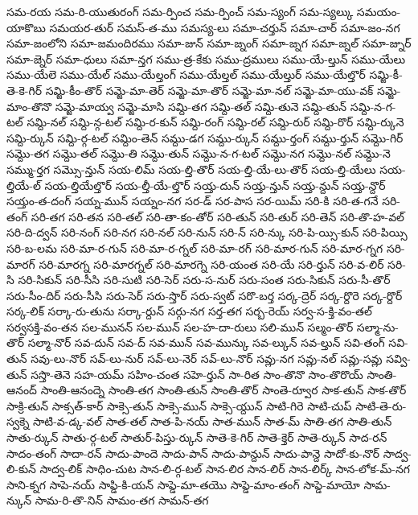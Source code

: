 {సమ-రయ
సమ-రి-యుతురంగ్
సమ-ర్పించ
సమ-ర్పించ్
సమ-స్యంగ్
సమ-స్యల్కు
సమయం-యాకొబు
సమయర-తుర్
సమస్-త-ము
సమస్య-లు
సమా-చర్తున్
సమా-చార్
సమా-జం-నగ
సమా-జంలోని
సమా-జమందిరము
సమా-జున్
సమా-జ్నంగ్
సమా-జ్నగ
సమా-జ్నల్
సమా-జ్నుర్
సమా-జ్నెర్
సమా-ధులు
సమా-న్తగ
సము-త్ర-కేకు
సము-ద్రములు
సము-యే-ల్తున్
సము-యేలు
సము-యేలె
సము-యేల్
సము-యేల్తంగ్
సము-యేల్తల్
సము-యేల్తుర్
సము-యేల్తొర్
సమ్జి-కీ-తె-కె-గిర్
సమ్జి-కీం-తొర్
సమ్జె-మా-తెర్
సమ్జె-మా-తొర్
సమ్జె-మా-నల్
సమ్జె-మా-యు-వక్
సమ్జె-మాం-తొనొ
సమ్జె-మాయ్వ
సమ్జె-మాసి
సమ్ది-తగ
సమ్ది-తల్
సమ్ది-తునె
సమ్ది-తున్
సమ్ది-న-గ-టల్
సమ్ది-నల్
సమ్ది-న్గ-టల్
సమ్ది-ర-కున్
సమ్ది-రంగ్
సమ్ది-రల్
సమ్ది-రుర్
సమ్ది-రొర్
సమ్ది-ర్కునె
సమ్ది-ర్కున్
సమ్ది-ర్గ-టల్
సమ్దిం-తెన్
సమ్దు-డగ
సమ్దు-ర్కున్
సమ్దు-ర్తంగ్
సమ్దు-ర్తున్
సమ్దొ-గిర్
సమ్దొ-తగ
సమ్దొ-తల్
సమ్దొ-తి
సమ్దొ-తున్
సమ్దొ-న-గ-టల్
సమ్దొ-నగ
సమ్దొ-నల్
సమ్దొ-నె
సమ్ము-ర్తగ
సమ్సొ-న్తున్
సయ-లిమ్
సయ-ల్తి-తొర్
సయ-ల్తి-యే-లు-తొర్
సయ-ల్తి-యేలు
సయ-ల్తియే-ల్
సయ-ల్తియేల్తొర్
సయ-ల్తీ-యే-ల్తొర్
సయ్త-దున్
సయ్త-న్తున్
సయ్త-న్దున్
సయ్త-న్దొర్
సయ్తం-త-దంగ్
సయ్న-మున్
సయ్నం-నగ
సర-డ్
సర-పాస
సర-యిమ్
సరి-కి
సరి-త-గనే
సరి-తంగ్
సరి-తగ
సరి-తన
సరి-తల్
సరి-తా-కం-తోర్
సరి-తున్
సరి-తుర్
సరి-తెన్
సరి-తొ-హ-వల్
సరి-ది-ద్వన్
సరి-నంగ్
సరి-నగ
సరి-నల్
సరి-నున్
సరి-న్
సరి-న్కు
సరి-పి-య్సి-కున్
సరి-పియ్సి
సరి-బ-లమ
సరి-మా-ర-గున్
సరి-మా-ర-గ్నల్
సరి-మా-రగ్
సరి-మార-గున్
సరి-మార-గ్నగ
సరి-మారగ్
సరి-మారగ్న
సరి-మారగ్నల్
సరి-మారగ్నె
సరి-యంత
సరి-యే
సరి-ర్తున్
సరి-వ-లిర్
సరి-సి
సరి-సికున్
సరి-సీసి
సరి-సుటి
సరి-సెర్
సరు-స-నుర్
సరు-సంత
సరు-సికున్
సరు-సీ-తొర్
సరు-సీం-దిర్
సరు-సీసి
సరు-సెర్
సరు-స్తొర్
సరు-స్వట్
సరొ-బర్త
సర్క-ద్రెర్
సర్క-ర్దొరె
సర్క-ర్దొర్
సర్క-లిక్
సర్కా-రు-తును
సర్కా-ర్దున్
సర్గు-నగ
సర్త-తగ
సర్బ-రెయ్
సర్వ-స-క్తి-వం-తల్
సర్వసక్తి-వం-తన
సల-మునన్
సల-మున్
సల-హ-దా-రులు
సలి-మున్
సల్మం-తొర్
సల్మా-ను-తొర్
సల్మా-నొర్
సవ-దున్
సవ-ద్
సవ-మున్
సవ-మున్కు
సవ-ల్కున్
సవ-ల్తున్
సవి-తంగ్
సవి-తున్
సవు-లు-నొర్
సవ్-లు-నుర్
సవ్-లు-నెర్
సవ్-లు-నొర్
సవ్లు-నగ
సవ్లు-నల్
సవ్లు-సవ్లు
సవ్వి-తున్
సస్తొ-తెనె
సహ-యమ్
సహిం-చంత
సహె-ర్తున్
సా-రిత
సాం-తొనొ
సాం-తొరొయ్
సాంతి-ఆనంద్
సాంతి-ఆనంద్నె
సాంతి-తగ
సాంతి-తున్
సాంతి-తొర్
సాంతె-ర్వూర
సాక-తున్
సాక-తొర్
సాక్రి-తున్
సాక్సత్-కార్
సాక్సె-తున్
సాక్సె-మున్
సాక్సె-య్దున్
సాటి-గిరె
సాటి-చుప్
సాటి-తె-రు-స్వక్నె
సాటి-వ-డ్క-వల్
సాత-తల్
సాత-పి-నయ్
సాత-మున్
సాత-మ్
సాతి-తగ
సాతి-తున్
సాతు-ర్కున్
సాతు-ర్గ-టల్
సాతుర్-పిస్తు-ర్కున్
సాతె-కె-గిర్
సాతె-క్తెర్
సాతె-ర్కున్
సాద-రన్
సాదం-తంగ్
సాదా-రన్
సాదు-పాందె
సాదు-పాన్
సాదు-పాన్దున్
సాదు-పాన్దె
సాదో-కు-నొర్
సాద్వ-లి-కున్
సాద్వ-లిక్
సాధిం-చుట
సాన-లి-ర్గ-టల్
సాన-లిర
సాన-లిర్
సాన-లిర్క్
సాన-లోక-మ్-నగ
సాని-క్నగ
సాపె-నయ్
సాప్డి-కి-యన్
సాప్డె-మా-తయొ
సాప్డె-మాం-తంగ్
సాప్డె-మాయో
సామ-న్కున్
సామ-రి-తొ-నిన్
సామం-తగ
సామన్-తగ
}
